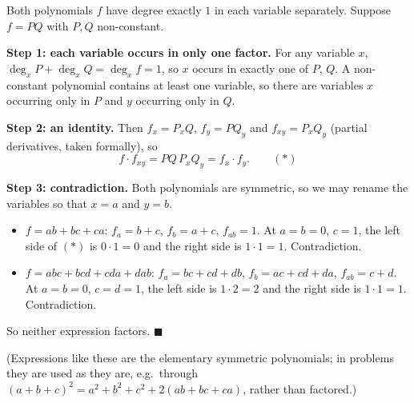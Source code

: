 Both polynomials $f$ have degree exactly $1$ in each variable separately. Suppose $f=PQ$ with $P,Q$ non-constant.

\textbf{Step 1: each variable occurs in only one factor.} For any variable $x$, $\deg_x P+\deg_x Q=\deg_x f=1$, so $x$ occurs in exactly one of $P$, $Q$. A non-constant polynomial contains at least one variable, so there are variables $x$ occurring only in $P$ and $y$ occurring only in $Q$.

\textbf{Step 2: an identity.} Then $f_x=P_xQ$, $f_y=PQ_y$ and $f_{xy}=P_xQ_y$ (partial derivatives, taken formally), so
\[
f\cdot f_{xy}=PQ\,P_xQ_y=f_x\cdot f_y .\qquad(\ast)
\]

\textbf{Step 3: contradiction.} Both polynomials are symmetric, so we may rename the variables so that $x=a$ and $y=b$.
\begin{itemize}
\item[(a)] $f=ab+bc+ca$: $f_a=b+c$, $f_b=a+c$, $f_{ab}=1$. At $a=b=0$, $c=1$, the left side of $(\ast)$ is $0\cdot1=0$ and the right side is $1\cdot1=1$. Contradiction.
\item[(b)] $f=abc+bcd+cda+dab$: $f_a=bc+cd+db$, $f_b=ac+cd+da$, $f_{ab}=c+d$. At $a=b=0$, $c=d=1$, the left side is $1\cdot2=2$ and the right side is $1\cdot1=1$. Contradiction.
\end{itemize}
So neither expression factors. $\blacksquare$

(Expressions like these are the elementary symmetric polynomials; in problems they are used as they are, e.g.\ through $(a+b+c)^2=a^2+b^2+c^2+2(ab+bc+ca)$, rather than factored.)

